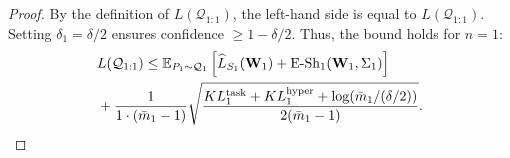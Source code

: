 \documentclass[letterpaper]{article} %
\begin{document}
\begin{proof}
By the definition of $L(\mathcal{Q}_{1:1})$, the left-hand side is equal to $L(\mathcal{Q}_{1:1})$. Setting $\delta_1 = \delta/2$ ensures confidence $\geq 1-\delta/2$. Thus, the bound holds for $n=1$:   
\begin{equation}
    \begin{aligned}
        &L(\mathcal{Q}_{1:1}) 
        \leq \mathbb{E}_{P_1 \sim \mathcal{Q}_1} \left[ \widehat{L}_{S_1}(\mathbf{W}_1) + \mathrm{E\text{-}Sh}_1 (\mathbf{W}_1, \Sigma_1)\right]  \\
        &+ \frac{1}{1 \cdot (\bar{m}_1 - 1)} \sqrt{\frac{KL^{\text{task}}_1 + KL^{\text{hyper}}_1 + \log(\bar{m}_1/(\delta/2))}{2(\bar{m}_1 - 1)}}.\notag
    \end{aligned}
\end{equation}
  

















\end{proof}
\end{document}
